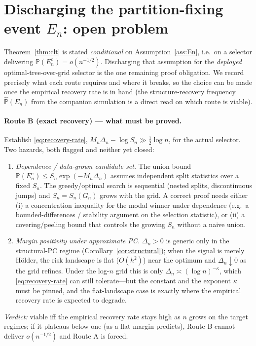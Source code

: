 \documentclass[11pt]{article}
\theoremstyle{plain}
\theoremstyle{definition}
\theoremstyle{remark}
\newcommand{\PP}{\mathbb{P}}
\newcommand{\odiff}{o}
\begin{document}
\section{Discharging the partition-fixing event \texorpdfstring{$E_n$}{En}: open problem}\label{sec:En-open}

Theorem~\ref{thm:clt} is stated \emph{conditional} on Assumption~\ref{ass:En},
i.e.\ on a selector delivering $\PP(E_n^c)=\odiff(n^{-1/2})$. Discharging that
assumption for the \emph{deployed} optimal-tree-over-grid selector is the one
remaining proof obligation. We record precisely what each route requires and
where it breaks, so the choice can be made once the empirical recovery rate is in
hand (the structure-recovery frequency $\widehat{\PP}(E_n)$ from the companion
simulation is a direct read on which route is viable).

\paragraph{Route B (exact recovery) --- what must be proved.}
Establish \eqref{eq:recovery-rate}, $M_n\Delta_n-\log S_n\gg\tfrac12\log n$, for
the actual selector. Two hazards, both flagged and neither yet closed:
\begin{enumerate}
  \item \emph{Dependence / data-grown candidate set.} The union bound
  $\PP(E_n^c)\le S_n\exp(-M_n\Delta_n)$ assumes independent split statistics over
  a fixed $S_n$. The greedy/optimal search is sequential (nested splits,
  discontinuous jumps) and $S_n=S_n(G_n)$ grows with the grid. A correct proof
  needs either (i) a concentration inequality for the modal winner under
  dependence (e.g.\ a bounded-differences / stability argument on the selection
  statistic), or (ii) a covering/peeling bound that controls the growing $S_n$
  without a naive union.
  \item \emph{Margin positivity under approximate PC.} $\Delta_n>0$ is generic
  only in the structural-PC regime (Corollary~\ref{cor:structural}); when the
  signal is merely H\"older, the risk landscape is flat ($O(h^2)$) near the
  optimum and $\Delta_n\downarrow0$ as the grid refines. Under the log-$n$ grid
  this is only $\Delta_n\asymp(\log n)^{-\kappa}$, which \eqref{eq:recovery-rate}
  can still tolerate---but the constant and the exponent $\kappa$ must be pinned,
  and the flat-landscape case is exactly where the empirical recovery rate is
  expected to degrade.
\end{enumerate}
\emph{Verdict:} viable iff the empirical recovery rate stays high as $n$ grows on
the target regimes; if it plateaus below one (as a flat margin predicts), Route B
cannot deliver $\odiff(n^{-1/2})$ and Route A is forced.
\end{document}
